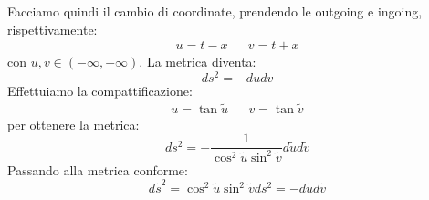 Facciamo quindi il cambio di coordinate, prendendo le outgoing e ingoing, rispettivamente:
\begin{align*}
    u = t - x && v = t + x
\end{align*}
con $u, v \in (-\infty,+\infty)$. La metrica diventa:
\begin{equation*}
    ds^2 = - dudv
\end{equation*}
Effettuiamo la compattificazione:
\begin{align*}
     u = \tan \tilde{u} && v = \tan \tilde{v}
\end{align*}
per ottenere la metrica:
\begin{equation*}
    ds^2 = - \frac{1}{\cos^2\tilde{u}\sin^2\tilde{v}}d\tilde{u}d\tilde{v}
\end{equation*}
Passando alla metrica conforme:
\begin{equation*}
    d\tilde{s}^2 = \cos^2\tilde{u}\sin^2\tilde{v} ds^2 = - d\tilde{u}d\tilde{v}
\end{equation*}

